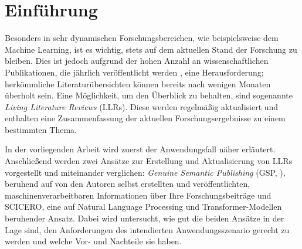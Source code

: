 \section{Einführung}
\label{sec:einfuehrung}

Besonders in sehr dynamischen Forschungsbereichen, wie beispielsweise dem Machine Learning, ist es wichtig, stets auf dem aktuellen Stand der Forschung zu bleiben.
Dies ist jedoch aufgrund der hohen Anzahl an wissenschaftlichen Publikationen, die jährlich veröffentlicht werden \cite{scientific-growth}, eine Herausforderung; herkömmliche Literaturübersichten können bereits nach wenigen Monaten überholt sein.
Eine Möglichkeit, um den Überblick zu behalten, sind sogenannte \textit{Living Literature Reviews} (LLRs).
Diese werden regelmäßig aktualisiert und enthalten eine Zusammenfassung der aktuellen Forschungsergebnisse zu einem bestimmten Thema.

In der vorliegenden Arbeit wird zuerst der Anwendungsfall näher erläutert.
Anschließend werden zwei Ansätze zur Erstellung und Aktualisierung von LLRs vorgestellt und miteinander verglichen:
\textit{Genuine Semantic Publishing} (GSP, \cite{kuhn2017genuine}), beruhend auf von den Autoren selbst erstellten und veröffentlichten, maschinenverarbeitbaren Informationen über Ihre Forschungsbeiträge und SCICERO, eine auf Natural Language Processing und Transformer-Modellen beruhender Ansatz.
Dabei wird untersucht, wie gut die beiden Ansätze in der Lage sind, den Anforderungen des intendierten Anwendungsszenario gerecht zu werden und welche Vor- und Nachteile sie haben.
